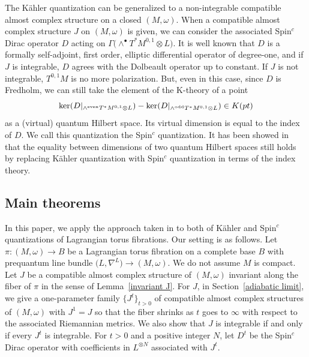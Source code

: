 \documentclass[pdftex]{sigma}
\numberwithin{equation}{section}
\begin{document}
The K\"ahler quantization can be generalized to a non-integrable compatible almost complex structure on a closed $(M,\omega)$. When a compatible almost complex structure $J$ on $(M,\omega)$ is given, we can consider the associated Spin${}^c$ Dirac operator $D$ acting on $\Gamma \bigl(\wedge^\bullet T^*M^{0,1}\otimes L\bigr)$. It is well known that $D$ is a formally self-adjoint, first order, elliptic differential operator of degree-one, and if $J$ is integrable, $D$ agrees with the Dolbeault operator up to constant. If $J$ is not integrable, $T^{0,1}M$ is no more polarization. But, even in this case, since $D$ is Fredholm, we can still take the element of the K-theory of a point
\[%
\ker ( D|_{\wedge^{\rm even}T^*M^{0,1}\otimes L}) -\ker ( D|_{\wedge^{\rm odd}T^*M^{0,1}\otimes L}) \in K(pt)
\]
as a (virtual) quantum Hilbert space. Its virtual dimension is equal to the index of $D$. We call this quantization the Spin${}^c$ quantization. It has been showed in~\cite{Andersen, FFY1,Kubota} that the equality between dimensions of two quantum Hilbert spaces still holds by replacing K\"ahler quantization with Spin${}^c$ quantization in terms of the index theory.

\subsection{Main theorems}
In this paper, we apply the approach taken in \cite{BFMN} to both of K\"ahler and Spin${}^c$ quantizations of Lagrangian torus fibrations. Our setting is as follows. Let $\pi\colon (M,\omega)\to B$ be a Lagrangian torus fibration on a complete base $B$ with prequantum line bundle $\bigl(L,\nabla^L\bigr)\to (M,\omega)$. We do not assume $M$ is compact. Let $J$ be
a compatible almost complex structure of $(M,\omega)$ invariant along the fiber of $\pi$ in the sense of Lemma~\ref{invariant J}. For $J$, in Section~\ref{adiabatic limit}, we give a one-parameter family $\big\{ J^t\big\}_{t>0}$ of compatible almost complex structures of $(M,\omega)$ with $J^1=J$ so that the fiber shrinks as $t$ goes to $\infty$ with respect to the associated Riemannian metrics. We also show that $J$ is integrable if and only if every $J^t$ is integrable. For $t>0$ and a positive integer $N$, let $D^t$ be the Spin${}^c$ Dirac operator with coefficients in $L^{\otimes N}$ associated with $J^t$.
\end{document}
